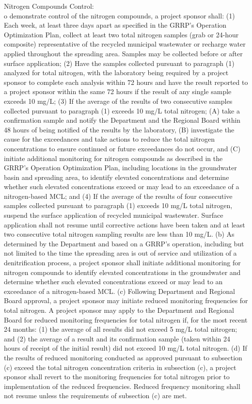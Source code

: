 \item Nitrogen Compounds Control:\\
o demonstrate control of the nitrogen compounds, a project sponsor shall:
(1) Each week, at least three days apart as specified in the GRRP's Operation Optimization Plan, collect at least two total nitrogen samples (grab or 24-hour composite) representative of the recycled municipal wastewater or recharge water applied throughout the spreading area. Samples may be collected before or after surface application;
(2) Have the samples collected pursuant to paragraph (1) analyzed for total nitrogen, with the laboratory being required by a project sponsor to complete each analysis within 72 hours and have the result reported to a project sponsor within the same 72 hours if the result of any single sample exceeds 10 mg/L;
(3) If the average of the results of two consecutive samples collected pursuant to paragraph (1) exceeds 10 mg/L total nitrogen;
(A) take a confirmation sample and notify the Department and the Regional Board within 48 hours of being notified of the results by the laboratory,
(B) investigate the cause for the exceedances and take actions to reduce the total nitrogen concentrations to ensure continued or future exceedances do not occur, and
(C) initiate additional monitoring for nitrogen compounds as described in the GRRP's Operation Optimization Plan, including locations in the groundwater basin and spreading area, to identify elevated concentrations and determine whether such elevated concentrations exceed or may lead to an exceedance of a nitrogen-based MCL; and
(4) If the average of the results of four consecutive samples collected pursuant to paragraph (1) exceeds 10 mg/L total nitrogen, suspend the surface application of recycled municipal wastewater. Surface application shall not resume until corrective actions have been taken and at least two consecutive total nitrogen sampling results are less than 10 mg/L.
(b) As determined by the Department and based on a GRRP's operation, including but not limited to the time the spreading area is out of service and utilization of a denitrification process, a project sponsor shall initiate additional monitoring for nitrogen compounds to identify elevated concentrations in the groundwater and determine whether such elevated concentrations exceed or may lead to an exceedance of a nitrogen-based MCL.
(c) Following Department and Regional Board approval, a project sponsor may initiate reduced monitoring frequencies for total nitrogen. A project sponsor may apply to the Department and Regional Board for reduced monitoring frequencies for total nitrogen if, for the most recent 24 months:
(1) the average of all results did not exceed 5 mg/L total nitrogen; and
(2) the average of a result and its confirmation sample (taken within 24 hours of receipt of the initial result) did not exceed 10 mg/L total nitrogen.
(d) If the results of reduced monitoring conducted as approved pursuant to subsection (c) exceed the total nitrogen concentration criteria in subsection (c), a project sponsor shall revert to the monitoring frequencies for total nitrogen prior to implementation of the reduced frequencies. Reduced frequency monitoring shall not resume unless the requirements of subsection (c) are met.

